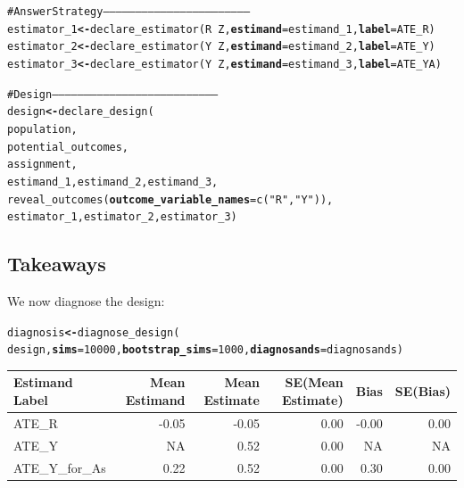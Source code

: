 \documentclass[11pt]{article}\usepackage[]{graphicx}\usepackage[]{color}
\makeatletter
\newcommand{\hlnum}[1]{\textcolor[rgb]{0,0,0}{#1}}%
\newcommand{\hlstr}[1]{\textcolor[rgb]{0,0,1}{#1}}%
\newcommand{\hlcom}[1]{\textcolor[rgb]{0.443,0.478,0.702}{#1}}%
\newcommand{\hlopt}[1]{\textcolor[rgb]{0,0,0}{#1}}%
\newcommand{\hlstd}[1]{\textcolor[rgb]{0,0,0}{#1}}%
\newcommand{\hlkwb}[1]{\textcolor[rgb]{0.498,0,0.333}{\textbf{#1}}}%
\newcommand{\hlkwc}[1]{\textcolor[rgb]{0.498,0,0.333}{\textbf{#1}}}%
\newcommand{\hlkwd}[1]{\textcolor[rgb]{0,0,0}{#1}}%
\newenvironment{kframe}{%
 \def\at@end@of@kframe{}%
 \ifinner\ifhmode%
  \def\at@end@of@kframe{\end{minipage}}%
  \begin{minipage}{\columnwidth}%
 \fi\fi%
 \def\FrameCommand##1{\hskip\@totalleftmargin \hskip-\fboxsep
 \colorbox{shadecolor}{##1}\hskip-\fboxsep
     \hskip-\linewidth \hskip-\@totalleftmargin \hskip\columnwidth}%
 \MakeFramed {\advance\hsize-\width
   \@totalleftmargin\z@ \linewidth\hsize
   \@setminipage}}%
 {\par\unskip\endMakeFramed%
 \at@end@of@kframe}
\newenvironment{knitrout}{}{} %
\makeatother
\begin{document}
\begin{codedeclaration}
\begin{knitrout}
\begin{kframe}
\begin{alltt}
\hlcom{# Answer Strategy ---------------------------------------------------------------------}
\hlstd{estimator_1} \hlkwb{<-} \hlkwd{declare_estimator}\hlstd{(R} \hlopt{~} \hlstd{Z,} \hlkwc{estimand} \hlstd{= estimand_1,} \hlkwc{label} \hlstd{= ATE_R)}
\hlstd{estimator_2} \hlkwb{<-} \hlkwd{declare_estimator}\hlstd{(Y} \hlopt{~} \hlstd{Z,} \hlkwc{estimand} \hlstd{= estimand_2,} \hlkwc{label} \hlstd{= ATE_Y)}
\hlstd{estimator_3} \hlkwb{<-} \hlkwd{declare_estimator}\hlstd{(Y} \hlopt{~} \hlstd{Z,} \hlkwc{estimand} \hlstd{= estimand_3,} \hlkwc{label} \hlstd{= ATE_YA)}

\hlcom{# Design ------------------------------------------------------------------------------}
\hlstd{design} \hlkwb{<-} \hlkwd{declare_design}\hlstd{(}
  \hlstd{population,}
  \hlstd{potential_outcomes,}
  \hlstd{assignment,}
  \hlstd{estimand_1, estimand_2, estimand_3,}
  \hlkwd{reveal_outcomes}\hlstd{(}\hlkwc{outcome_variable_names} \hlstd{=} \hlkwd{c}\hlstd{(}\hlstr{"R"}\hlstd{,} \hlstr{"Y"}\hlstd{)),}
  \hlstd{estimator_1, estimator_2, estimator_3)}
\end{alltt}
\end{kframe}
\end{knitrout}

\end{codedeclaration}
\clearpage

\subsection*{Takeaways} 

We now diagnose the design:

\begin{codedeclaration}
\begin{knitrout}\small
{}\color{fgcolor}\begin{kframe}
\begin{alltt}
\hlstd{diagnosis} \hlkwb{<-} \hlkwd{diagnose_design}\hlstd{(}
  \hlstd{design,} \hlkwc{sims} \hlstd{=} \hlnum{10000}\hlstd{,} \hlkwc{bootstrap_sims} \hlstd{=} \hlnum{1000}\hlstd{,} \hlkwc{diagnosands} \hlstd{= diagnosands)}
\end{alltt}
\end{kframe}
\end{knitrout}
\end{codedeclaration}

\begin{table}[ht]
\centering
\begin{tabular}{lrrrrr}
  \hline
Estimand Label & Mean Estimand & Mean Estimate & SE(Mean Estimate) & Bias & SE(Bias) \\ 
  \hline
ATE\_R & -0.05 & -0.05 & 0.00 & -0.00 & 0.00 \\ 
  ATE\_Y & NA & 0.52 & 0.00 & NA & NA \\ 
  ATE\_Y\_for\_As & 0.22 & 0.52 & 0.00 & 0.30 & 0.00 \\ 
   \hline
\end{tabular}
\end{table}
\end{document}
